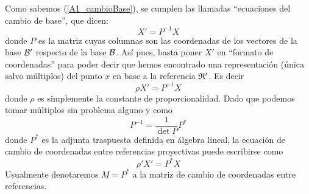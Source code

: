 Como sabemos (\ref{A1_cambioBase}), se cumplen las llamadas ``ecuaciones del cambio de base'', que dicen:
\begin{equation*}
	X'=P^{-1}X
\end{equation*}
donde $P$ es la matriz cuyas columnas son las coordenadas de los vectores de la base $\mathcal{B}'$ respecto de la base $\mathcal{B}$. Así pues, basta poner $X'$ en ``formato de coordenadas'' para poder decir que hemos encontrado una representación (única salvo múltiplos) del punto $x$ en base a la referencia $\mathfrak{R}'$. Es decir
\begin{equation}
	 \rho X'=P^{-1}X
\end{equation}
donde $\rho$ es simplemente la constante de proporcionalidad. Dado que podemos tomar múltiplos sin problema alguno y como
\begin{equation*}
	P^{-1}=\frac{1}{\det{P}}P^*
\end{equation*}
donde $P^*$ es la adjunta traspuesta definida en álgebra lineal, la ecuación de cambio de coordenadas entre referencias proyectivas puede escribirse como
\begin{equation}
	\rho' X'=P^*X
\end{equation}
Usualmente denotaremos $M=P^*$ a la matriz de cambio de coordenadas entre referencias.

